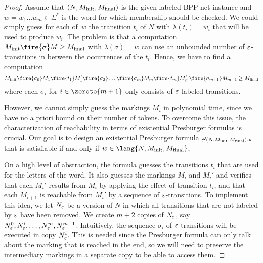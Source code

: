\documentclass[../../diss.tex]{subfiles}
\begin{document}
\begin{proof}
    Assume that $(N,M_{\text{init}},M_{\text{final}})$ is the given labeled BPP net instance and $w = w_1 \ldots w_m \in \Sigma^*$ is the word for which membership should be checked.
    We could simply guess for each  of~$w$ the transition $t_i$ of $N$ with $\lambda(t_i) = w_i$ that will be used to produce $w_i$.
    The problem is that a computation $\Minit \fire{\sigma} M \geq \Mfinal$ with $\lambda(\sigma) = w$ can use an unbounded number of $\varepsilon$-transitions in between the occurrences of the $t_i$.
    Hence, we have to find a computation
    \[
        \Minit \fire{\sigma_0} M_1 \fire{t_1} M_1' \fire{\sigma_2} \ldots \fire{\sigma_m} M_m \fire{t_m} M_m' \fire{\sigma_{m+1}} M_{m+1} \geq \Mfinal
    \]
    where each $\sigma_i$ for $i \in \zeroto{m+1}$ only consists of $\varepsilon$-labeled transitions.

    However, we cannot simply guess the markings $M_i$ in polynomial time, since we have no a priori bound on their number of tokens.
    To overcome this issue, the characterization of reachability in terms of existential Presburger formulas is crucial.
    Our goal is to design an existential Presburger formula $\varphi_{(N,M_{\text{init}},M_{\text{final}}),w}$ that is satisfiable if and only if $w \in \lang{N,\Minit,\Mfinal}$,

    On a high level of abstraction, the formula guesses the transitions $t_i$ that are used for the letters of the word.
    It also guesses the markings $M_i$ and $M_i'$ and verifies that each $M_i'$ results from $M_i$ by applying the effect of transition $t_i$, and that each $M_{i+1}$ is reachable from $M_{i}'$ by a sequence of $\varepsilon$-transitions.
    To implement this idea, we let $N_\varepsilon$ be a version of $N$ in which all transitions that are not labeled by $\varepsilon$ have been removed.
    We create $m+2$ copies of $N_\varepsilon$, say $N_\varepsilon^0, N_\varepsilon^i, \ldots, N_\varepsilon^m, N_\varepsilon^{m+1}$.
    Intuitively, the sequence $\sigma_i$ of $\varepsilon$-transitions will be executed in copy $N_\varepsilon^i$.
    This is needed since the Presburger formula can only talk about the marking that is reached in the end, so we will need to preserve the intermediary markings in a separate copy to be able to access them.


\end{proof}
\end{document}
